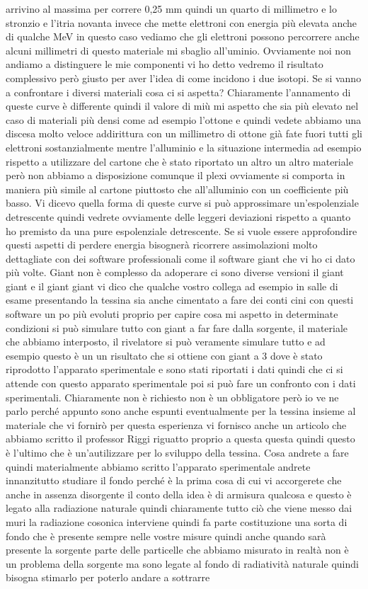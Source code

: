 arrivino al massima per correre 0,25 mm quindi un quarto di millimetro e lo stronzio e l'itria novanta invece che mette elettroni con energia più elevata anche di qualche MeV in questo caso vediamo che gli elettroni possono percorrere anche alcuni millimetri di questo materiale mi sbaglio all'uminio. Ovviamente noi non andiamo a distinguere le mie componenti vi ho detto vedremo il risultato complessivo però giusto per aver l'idea di come incidono i due isotopi. Se si vanno a confrontare i diversi materiali cosa ci si aspetta? Chiaramente l'annamento di queste curve è differente quindi il valore di miù mi aspetto che sia più elevato nel caso di materiali più densi come ad esempio l'ottone e quindi vedete abbiamo una discesa molto veloce addirittura con un millimetro di ottone già fate fuori tutti gli elettroni sostanzialmente mentre l'alluminio e la situazione intermedia ad esempio rispetto a utilizzare del cartone che è stato riportato un altro un altro materiale però non abbiamo a disposizione comunque il plexi ovviamente si comporta in maniera più simile al cartone piuttosto che all'alluminio con un coefficiente più basso. Vi dicevo quella forma di queste curve si può approssimare un'espolenziale detrescente quindi vedrete ovviamente delle leggeri deviazioni rispetto a quanto ho premisto da una pure espolenziale detrescente. Se si vuole essere approfondire questi aspetti di perdere energia bisognerà ricorrere assimolazioni molto dettagliate con dei software professionali come il software giant che vi ho ci dato più volte. Giant non è complesso da adoperare ci sono diverse versioni il giant giant e il giant giant vi dico che qualche vostro collega ad esempio in salle di esame presentando la tessina sia anche cimentato a fare dei conti cini con questi software un po più evoluti proprio per capire cosa mi aspetto in determinate condizioni si può simulare tutto con giant a far fare dalla sorgente, il materiale che abbiamo interposto, il rivelatore si può veramente simulare tutto e ad esempio questo è un un risultato che si ottiene con giant a 3 dove è stato riprodotto l'apparato sperimentale e sono stati riportati i dati quindi che ci si attende con questo apparato sperimentale poi si può fare un confronto con i dati sperimentali. Chiaramente non è richiesto non è un obbligatore però io ve ne parlo perché appunto sono anche espunti eventualmente per la tessina insieme al materiale che vi fornirò per questa esperienza vi fornisco anche un articolo che abbiamo scritto il professor Riggi riguatto proprio a questa questa quindi questo è l'ultimo che è un'autilizzare per lo sviluppo della tessina. Cosa andrete a fare quindi materialmente abbiamo scritto l'apparato sperimentale andrete innanzitutto studiare il fondo perché è la prima cosa di cui vi accorgerete che anche in assenza disorgente il conto della idea è di armisura qualcosa e questo è legato alla radiazione naturale quindi chiaramente tutto ciò che viene messo dai muri la radiazione cosonica interviene quindi fa parte costituzione una sorta di fondo che è presente sempre nelle vostre misure quindi anche quando sarà presente la sorgente parte delle particelle che abbiamo misurato in realtà non è un problema della sorgente ma sono legate al fondo di radiatività naturale quindi bisogna stimarlo per poterlo andare a sottrarre 